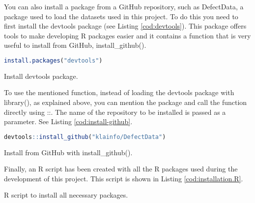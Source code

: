 You can also install a package from a GitHub repository, such as DefectData, a package used to load the datasets used in this project. To do this you need to first install the devtools package (see Listing \ref{cod:devtools}). This package offers tools to make developing R packages easier and it contains a function that is very useful to install from GitHub, install\_github().

\begin{codefloat}
\begin{lstlisting}[language=R, style=Ccolor]
install.packages("devtools") 
\end{lstlisting}
\caption{Install devtools package.}
\label{cod:devtools}
\end{codefloat}

To use the mentioned function, instead of loading the devtools package with library(), as explained above, you can mention the package and call the function directly using ::. The name of the repository to be installed is passed as a parameter. See Listing \ref{cod:install-github}.

\begin{codefloat}
\begin{lstlisting}[language=R, style=Ccolor]
devtools::install_github("klainfo/DefectData")
\end{lstlisting}
\caption{Install from GitHub with install\_github().}
\label{cod:install-github}
\end{codefloat}

Finally, an R script has been created with all the R packages used during the development of this project. This script is shown in Listing \ref{cod:installation.R}.

\begin{codefloat}[b]

\caption{R script to install all necessary packages.}
\label{cod:installation.R}
\end{codefloat}